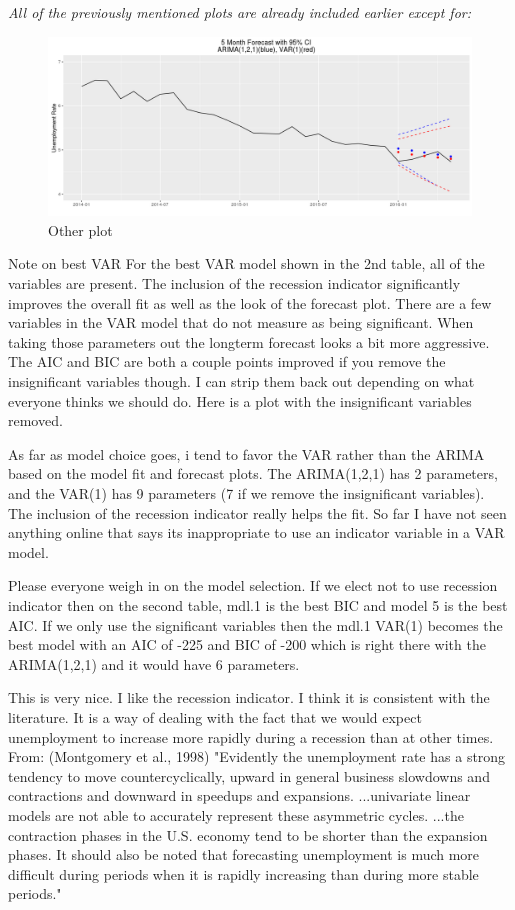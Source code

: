 \documentclass[twoside,twocolumn]{article}
\begin{document}
\textit{All of the previously mentioned plots are already included earlier except for:}
    \begin{figure}[H]
    	\centering
     	\caption{Other plot}
     	\includegraphics[width=\linewidth]{images/arimavarforcastalso}
 \end{figure}
 
 
 Note on best VAR
For the best VAR model shown in the 2nd table, all of the variables are present. The inclusion of the recession indicator significantly improves the overall fit as well as the look of the forecast plot. There are a few variables in the VAR model that do not measure as being significant. When taking those parameters out the longterm forecast looks a bit more aggressive. The AIC and BIC are both a couple points improved if you remove the insignificant variables though. I can strip them back out depending on what everyone thinks we should do. Here is a plot with the insignificant variables removed.

As far as model choice goes, i tend to favor the VAR rather than the ARIMA based on the model fit and forecast plots. The ARIMA(1,2,1) has 2 parameters, and the VAR(1) has 9 parameters (7 if we remove the insignificant variables). The inclusion of the recession indicator really helps the fit. So far I have not seen anything online that says its inappropriate to use an indicator variable in a VAR model.

Please everyone weigh in on the model selection. If we elect not to use recession indicator then on the second table, mdl.1 is the best BIC and model 5 is the best AIC. If we only use the significant variables then the mdl.1 VAR(1) becomes the best model with an AIC of -225 and BIC of -200 which is right there with the ARIMA(1,2,1) and it would have 6 parameters.

This is very nice. I like the recession indicator. I think it is consistent with the literature. It is a way of dealing with the fact that we would expect unemployment to increase more rapidly during a recession than at other times. From: (Montgomery et al., 1998) "Evidently the unemployment rate has a strong tendency to move countercyclically, upward in general business slowdowns and contractions and downward in speedups and expansions. ...univariate linear models are not able to accurately represent these asymmetric cycles. ...the contraction phases in the U.S. economy tend to be shorter than the expansion phases. It should also be noted that forecasting unemployment is much more difficult during periods when it is rapidly increasing than during more stable periods."
\end{document}
